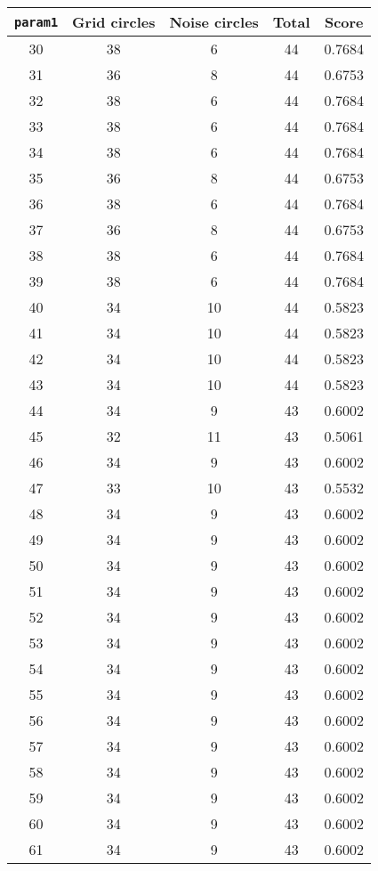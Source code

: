 \documentclass[letterpaper, 12pt]{article}
\begin{document}
\begin{longtable}{|c|c|c|c|c|}
\hline
\textbf{\texttt{param1}} & \textbf{Grid circles} & \textbf{Noise circles} & \textbf{Total} & \textbf{Score} \\
\hline
30 & 38 & 6 & 44 & 0.7684 \\
\hline
31 & 36 & 8 & 44 & 0.6753 \\
\hline
32 & 38 & 6 & 44 & 0.7684 \\
\hline
33 & 38 & 6 & 44 & 0.7684 \\
\hline
34 & 38 & 6 & 44 & 0.7684 \\
\hline
35 & 36 & 8 & 44 & 0.6753 \\
\hline
36 & 38 & 6 & 44 & 0.7684 \\
\hline
37 & 36 & 8 & 44 & 0.6753 \\
\hline
38 & 38 & 6 & 44 & 0.7684 \\
\hline
39 & 38 & 6 & 44 & 0.7684 \\
\hline
40 & 34 & 10 & 44 & 0.5823 \\
\hline
41 & 34 & 10 & 44 & 0.5823 \\
\hline
42 & 34 & 10 & 44 & 0.5823 \\
\hline
43 & 34 & 10 & 44 & 0.5823 \\
\hline
44 & 34 & 9 & 43 & 0.6002 \\
\hline
45 & 32 & 11 & 43 & 0.5061 \\
\hline
46 & 34 & 9 & 43 & 0.6002 \\
\hline
47 & 33 & 10 & 43 & 0.5532 \\
\hline
48 & 34 & 9 & 43 & 0.6002 \\
\hline
49 & 34 & 9 & 43 & 0.6002 \\
\hline
50 & 34 & 9 & 43 & 0.6002 \\
\hline
51 & 34 & 9 & 43 & 0.6002 \\
\hline
52 & 34 & 9 & 43 & 0.6002 \\
\hline
53 & 34 & 9 & 43 & 0.6002 \\
\hline
54 & 34 & 9 & 43 & 0.6002 \\
\hline
55 & 34 & 9 & 43 & 0.6002 \\
\hline
56 & 34 & 9 & 43 & 0.6002 \\
\hline
57 & 34 & 9 & 43 & 0.6002 \\
\hline
58 & 34 & 9 & 43 & 0.6002 \\
\hline
59 & 34 & 9 & 43 & 0.6002 \\
\hline
60 & 34 & 9 & 43 & 0.6002 \\
\hline
61 & 34 & 9 & 43 & 0.6002 \\

\end{longtable}
\end{document}

